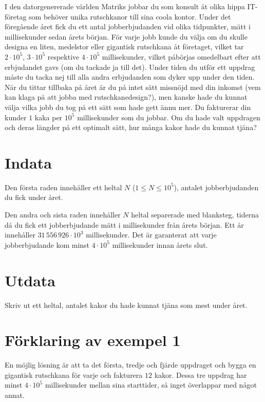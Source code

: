 I den datorgenererade världen Matriks jobbar du som konsult åt olika hippa IT-företag som behöver unika rutschkanor till sina coola kontor.
Under det föregående året fick du ett antal jobberbjudanden vid olika tidpunkter, mätt i millisekunder sedan årets början.
För varje jobb kunde du välja om du skulle designa en liten, medelstor eller gigantisk rutschkana åt företaget, vilket tar $2 \cdot 10^5$, $3 \cdot 10^5$ respektive $4 \cdot 10^5$ millisekunder, vilket påbörjas omedelbart efter att erbjudandet gavs (om du tackade ja till det).
Under tiden du utför ett uppdrag måste du tacka nej till alla andra erbjudanden som dyker upp under den tiden.
När du tittar tillbaka på året är du på intet sätt missnöjd med din inkomst (vem kan klaga på att jobba med rutschkanedesign?), men kanske hade du kunnat välja vilka jobb du tog på ett sätt som hade gett ännu mer.
Du fakturerar din kunder $1$ kaka per $10^5$ millisekunder som du jobbar.
Om du hade valt uppdragen och deras längder på ett optimalt sätt, hur många kakor hade du kunnat tjäna?


\section*{Indata}
Den första raden innehåller ett heltal $N$ ($1 \le N \le 10^5$), antalet jobberbjudanden du fick under året.

Den andra och sista raden innehåller $N$ heltal separerade med blanksteg, tiderna då du fick ett jobberbjudande mätt i millisekunder från årets början.
Ett år innehåller $31\,556\,926 \cdot 10^3$ millisekunder.
Det är garanterat att varje jobberbjudande kom minst $4 \cdot 10^5$ millisekunder innan årets slut.

\section*{Utdata}
Skriv ut ett heltal, antalet kakor du hade kunnat tjäna som mest under året.

\section*{Förklaring av exempel 1}
En möjlig lösning är att ta det första, tredje och fjärde uppdraget och bygga en gigantisk rutschkana för varje och fakturera $12$ kakor.
Dessa tre uppdrag har minst $4 \cdot 10^5$ millisekunder mellan sina starttider, så inget överlappar med något annat.
